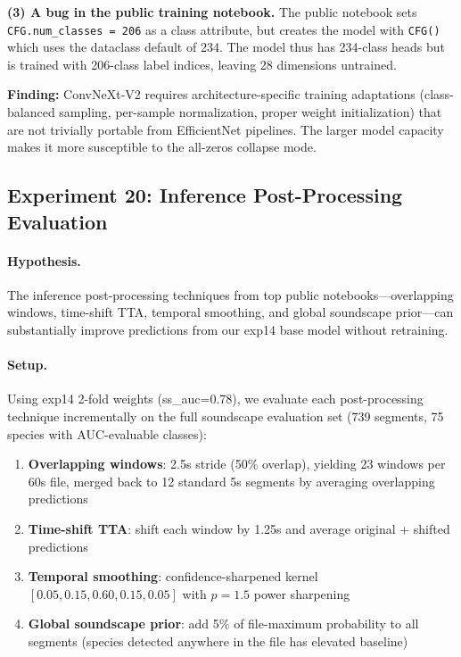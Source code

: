 \textbf{(3) A bug in the public training notebook.}
The public notebook sets \texttt{CFG.num\_classes = 206} as a class attribute,
but creates the model with \texttt{CFG()} which uses the dataclass default of 234.
The model thus has 234-class heads but is trained with 206-class label indices,
leaving 28 dimensions untrained.

\textbf{Finding:} ConvNeXt-V2 requires architecture-specific training adaptations
(class-balanced sampling, per-sample normalization, proper weight initialization)
that are not trivially portable from EfficientNet pipelines. The larger model
capacity makes it more susceptible to the all-zeros collapse mode.

\subsection{Experiment 20: Inference Post-Processing Evaluation}
\label{sec:exp20}

\paragraph{Hypothesis.}
The inference post-processing techniques from top public notebooks---overlapping
windows, time-shift TTA, temporal smoothing, and global soundscape prior---can
substantially improve predictions from our exp14 base model without retraining.

\paragraph{Setup.}
Using exp14 2-fold weights (ss\_auc=0.78), we evaluate each post-processing
technique incrementally on the full soundscape evaluation set (739 segments,
75 species with AUC-evaluable classes):

\begin{enumerate}
    \item \textbf{Overlapping windows}: 2.5s stride (50\% overlap), yielding
    23 windows per 60s file, merged back to 12 standard 5s segments by averaging
    overlapping predictions
    \item \textbf{Time-shift TTA}: shift each window by 1.25s and average
    original + shifted predictions
    \item \textbf{Temporal smoothing}: confidence-sharpened kernel
    $[0.05, 0.15, 0.60, 0.15, 0.05]$ with $p=1.5$ power sharpening
    \item \textbf{Global soundscape prior}: add 5\% of file-maximum probability
    to all segments (species detected anywhere in the file has elevated baseline)
\end{enumerate}

